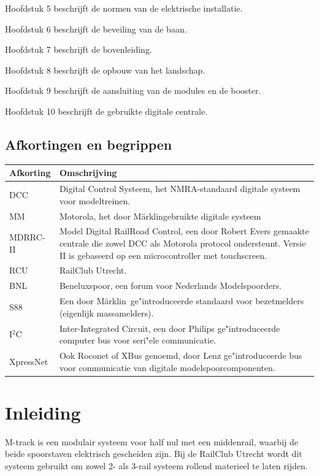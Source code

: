 \documentclass[12pt,a4paper]{report}
\newcommand*{\marklin}{M\"{a}rklin}
\newcommand*{\isqc}{I$^{2}$C}
\begin{document}
Hoofdstuk 5 beschrijft de normen van de elektrische installatie.

Hoofdstuk 6 beschrijft de beveiling van de baan.

Hoofdstuk 7 beschrijft de bovenleiding.

Hoofdstuk 8 beschrijft de opbouw van het landschap.

Hoofdstuk 9 beschrijft de aansluiting van de modules en de booster.

Hoofdstuk 10 beschrijft de gebruikte digitale centrale.

\section{Afkortingen en begrippen}
\begin{tabular}{| l |p{13cm}|}
\hline
\rowcolor[gray]{0.84}Afkorting & Omschrijving\\
\hline
DCC & Digital Control Systeem, het NMRA-standaard digitale systeem voor modeltreinen.\\
\hline
MM & Motorola, het door \marklin gebruikte digitale systeem\\
\hline
MDRRC-II&Model Digital RailRoad Control, een door Robert Evers gemaakte centrale die zowel DCC als Motorola protocol ondersteunt. Versie II is gebaseerd op een microcontroller met touchscreen.\\
\hline
RCU&RailClub Utrecht.\\
\hline
BNL&Beneluxspoor, een forum voor Nederlands Modelspoorders.\\
\hline
S88&Een door \marklin \ ge"{i}ntroduceerde standaard voor bezetmelders (eigenlijk massamelders).\\
\hline
\isqc &Inter-Integrated Circuit, een door Philips ge"{i}ntroduceerde computer bus voor seri"{e}le communicatie.\\
\hline
XpressNet&Ook Roconet of XBus genoemd, door Lenz ge"{i}ntroduceerde bus voor communicatie van digitale modelspoorcomponenten.\\
\hline
\end{tabular}

\chapter{Inleiding}

M-track is een modulair systeem voor half nul met een middenrail, waarbij de beide spoorstaven elektrisch gescheiden zijn. Bij de RailClub Utrecht wordt dit systeem gebruikt om zowel 2- als 3-rail systeem rollend materieel te laten rijden.
\end{document}
